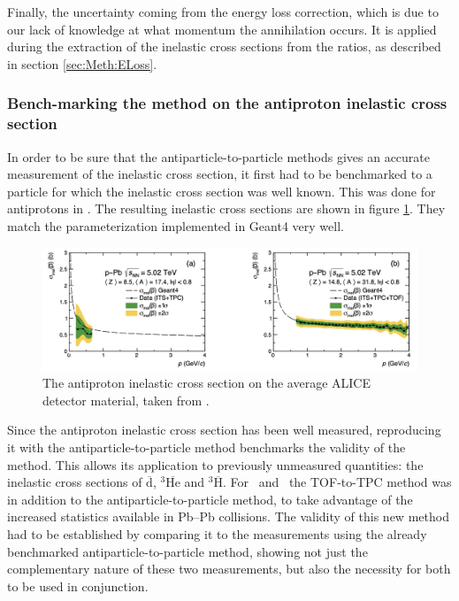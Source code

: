 Finally, the uncertainty coming from the energy loss correction, which is due to our lack of knowledge at what momentum the annihilation occurs. It is applied during the extraction of the inelastic cross sections from the ratios, as described in section \ref{sec:Meth:ELoss}.   


\subsubsection{Bench-marking the method on the antiproton inelastic cross section}
In order to be sure that the antiparticle-to-particle methods gives an accurate measurement of the inelastic cross section, it first had to be benchmarked to a particle for which the inelastic cross section was well known. This was done for antiprotons in \cite{antideuteronXS}. The resulting inelastic cross sections are shown in figure \ref{fig:pbar_sigma_inel}. They match the parameterization implemented in Geant4 very well.\\

\begin{figure}
    \centering
    \includegraphics[width=\textwidth]{figures/antiproton_inelastic_xs.png}
    \caption{The antiproton inelastic cross section on the average ALICE detector material, taken from \cite{antideuteronXS}.}
    \label{fig:pbar_sigma_inel}
\end{figure}

Since the antiproton inelastic cross section has been well measured, reproducing it with the antiparticle-to-particle method benchmarks the validity of the method. This allows its application to previously unmeasured quantities: the inelastic cross sections of $\overline{\mathrm{d}}$, $^3\overline{\mathrm{He}}$ and $^3\overline{\mathrm{H}}$. For \ahe\ and \atrit\ the TOF-to-TPC method was in addition to the antiparticle-to-particle method, to take advantage of the increased statistics available in Pb--Pb collisions. The validity of this new method had to be established by comparing it to the measurements using the already benchmarked antiparticle-to-particle method, showing not just the complementary nature of these two measurements, but also the necessity for both to be used in conjunction.
